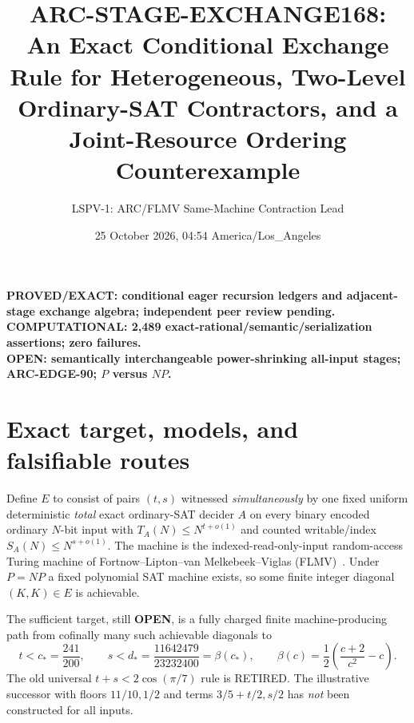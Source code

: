 \documentclass[11pt]{article}
\title{ARC-STAGE-EXCHANGE168:\\
\large An Exact Conditional Exchange Rule for Heterogeneous, Two-Level Ordinary-SAT Contractors, and a Joint-Resource Ordering Counterexample}
\author{LSPV-1: ARC/FLMV Same-Machine Contraction Lead}
\date{25 October 2026, 04:54 America/Los\_Angeles}
\newcommand{\OPEN}{\textbf{OPEN}}
\begin{document}
\maketitle
\begin{center}
\textbf{PROVED/EXACT: conditional eager recursion ledgers and adjacent-stage exchange algebra; independent peer review pending.}\\
\textbf{COMPUTATIONAL: 2,489 exact-rational/semantic/serialization assertions; zero failures.}\\
\textbf{OPEN: semantically interchangeable power-shrinking all-input stages; ARC-EDGE-90; $P$ versus $NP$.}
\end{center}

\section{Exact target, models, and falsifiable routes}
Define $E$ to consist of pairs $(t,s)$ witnessed \emph{simultaneously} by
one fixed uniform deterministic \emph{total} exact ordinary-SAT decider
$A$ on every binary encoded ordinary $N$-bit input with
$T_A(N)\le N^{t+o(1)}$ and counted writable/index
$S_A(N)\le N^{s+o(1)}$. The machine is the indexed-read-only-input
random-access Turing machine of Fortnow--Lipton--van Melkebeek--Viglas
(FLMV)~\cite{flmv}. Under $P=NP$ a fixed polynomial SAT machine exists,
so some finite integer diagonal $(K,K)\in E$ is achievable.

The sufficient target, still \OPEN, is a fully charged finite
machine-producing path from cofinally many such achievable diagonals to
\[
 t<c_*=\frac{241}{200},\qquad
 s<d_*=\frac{11642479}{23232400}
 =\beta(c_*),\qquad
 \beta(c)=\frac12\left(\frac{c+2}{c^2}-c\right).
\tag{1}
\]
The old universal $t+s<2\cos(\pi/7)$ rule is RETIRED.
The illustrative successor with floors $11/10,1/2$ and terms
$3/5+t/2,s/2$ has \emph{not} been constructed for all inputs.
\end{document}
